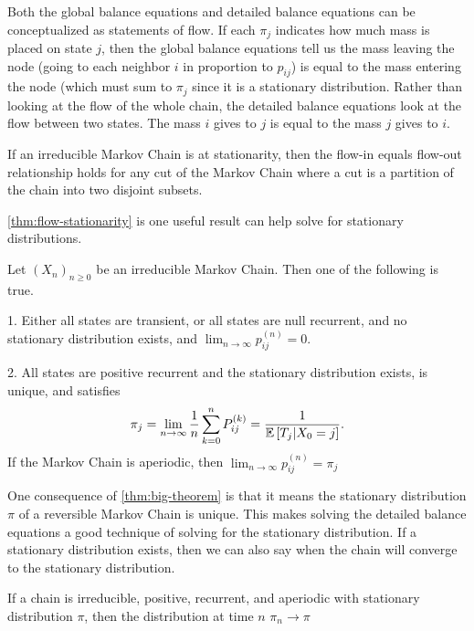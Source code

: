 Both the global balance equations and detailed balance equations can be conceptualized as statements of flow.
If each $\pi_j$ indicates how much mass is placed on state $j$, then the global balance equations tell us the mass leaving the node (going to each neighbor $i$ in proportion to $p_{ij}$) is equal to the mass entering the node (which must sum to $\pi_j$ since it is a stationary distribution.
Rather than looking at the flow of the whole chain, the detailed balance equations look at the flow between two states. The mass $i$ gives to $j$ is equal to the mass $j$ gives to $i$.
\begin{theorem}
	If an irreducible Markov Chain is at stationarity, then the flow-in equals flow-out relationship holds for any cut of the Markov Chain where a cut is a partition of the chain into two disjoint subsets.
	\label{thm:flow-stationarity}
\end{theorem}
\cref{thm:flow-stationarity} is one useful result can help solve for stationary distributions.
\begin{theorem}
	Let $(X_n)_{n\geq 0}$ be an irreducible Markov Chain. Then one of the following is true.

	1. Either all states are transient, or all states are null recurrent, and no stationary distribution exists, and $\lim_{n\to\infty}p_{ij}^{(n)} = 0$.
	
	2. All states are positive recurrent and the stationary distribution exists, is unique, and satisfies \[
		\pi_j = \lim_{n\to\infty}\frac{1}{n}\sum_{k=0}^{n}P_{ij}^{(k)} = \frac{1}{\mathbb{E}\left[T_j|X_0=j\right]}.
		\]
		If the Markov Chain is aperiodic, then $\lim_{n\to\infty}p_{ij}^{(n)} = \pi_j$
	\label{thm:big-theorem}
\end{theorem}
One consequence of \cref{thm:big-theorem} is that it means the stationary distribution $\pi$ of a reversible Markov Chain is unique.
This makes solving the detailed balance equations a good technique of solving for the stationary distribution.
If a stationary distribution exists, then we can also say when the chain will converge to the stationary distribution.
\begin{theorem}
	If a chain is irreducible, positive, recurrent, and aperiodic with stationary distribution $\pi$, then the distribution at time $n$ $\pi_n \to \pi$
	\label{thm:mc-convergence}
\end{theorem}
